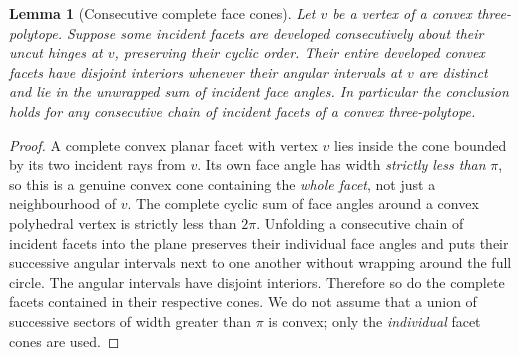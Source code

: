 \documentclass[11pt]{amsart}
\newtheorem{lemma}[theorem]{Lemma}
\begin{document}
\begin{lemma}[Consecutive complete face cones]\label{lem:cones}
Let \(v\) be a vertex of a convex three-polytope. Suppose some incident facets are developed consecutively about their uncut hinges at \(v\), preserving their cyclic order. Their entire developed convex facets have disjoint interiors whenever their angular intervals at \(v\) are distinct and lie in the unwrapped sum of incident face angles. In particular the conclusion holds for any consecutive chain of incident facets of a convex three-polytope.
\end{lemma}
\begin{proof}
A complete convex planar facet with vertex \(v\) lies inside the cone bounded by its two incident rays from \(v\). Its own face angle has width \emph{strictly less than} \(\pi\), so this is a genuine convex cone containing the \emph{whole facet}, not just a neighbourhood of \(v\). The complete cyclic sum of face angles around a convex polyhedral vertex is strictly less than \(2\pi\). Unfolding a consecutive chain of incident facets into the plane preserves their individual face angles and puts their successive angular intervals next to one another without wrapping around the full circle. The angular intervals have disjoint interiors. Therefore so do the complete facets contained in their respective cones. We do not assume that a union of successive sectors of width greater than \(\pi\) is convex; only the \emph{individual} facet cones are used.
\end{proof}
\end{document}

